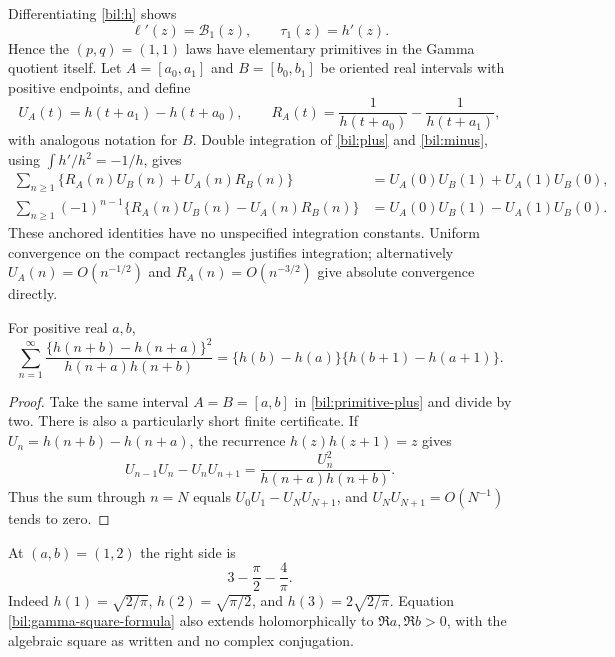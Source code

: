 Differentiating \eqref{bil:h} shows
\begin{equation}\label{bil:h-derivative}
 \ell'(z)=\mathcal B_1(z),\qquad \tau_1(z)=h'(z).
\end{equation}
Hence the $(p,q)=(1,1)$ laws have elementary primitives in the Gamma
quotient itself. Let $A=[a_0,a_1]$ and $B=[b_0,b_1]$ be oriented
real intervals with positive endpoints, and define
\[
 U_A(t)=h(t+a_1)-h(t+a_0),\qquad
 R_A(t)=\frac1{h(t+a_0)}-\frac1{h(t+a_1)},
\]
with analogous notation for $B$. Double integration of
\eqref{bil:plus} and \eqref{bil:minus}, using
$\int h'/h^2=-1/h$, gives
\begin{align}
 \sum_{n\ge1}\{R_A(n)U_B(n)+U_A(n)R_B(n)\}
 &=U_A(0)U_B(1)+U_A(1)U_B(0),\label{bil:primitive-plus}\\
 \sum_{n\ge1}(-1)^{n-1}\{R_A(n)U_B(n)-U_A(n)R_B(n)\}
 &=U_A(0)U_B(1)-U_A(1)U_B(0).\label{bil:primitive-minus}
\end{align}
These anchored identities have no unspecified integration constants.
Uniform convergence on the compact rectangles justifies integration;
alternatively $U_A(n)=O(n^{-1/2})$ and $R_A(n)=O(n^{-3/2})$
give absolute convergence directly.

\begin{corollary}\label{bil:gamma-square}
For positive real $a,b$,
\begin{equation}\label{bil:gamma-square-formula}
 \boxed{\sum_{n=1}^{\infty}
   \frac{\{h(n+b)-h(n+a)\}^{2}}{h(n+a)h(n+b)}
   =\{h(b)-h(a)\}\{h(b+1)-h(a+1)\}.}
\end{equation}
\end{corollary}
\begin{proof}
Take the same interval $A=B=[a,b]$ in
\eqref{bil:primitive-plus} and divide by two.
There is also a particularly short finite certificate. If
$U_n=h(n+b)-h(n+a)$, the recurrence $h(z)h(z+1)=z$ gives
\[
 U_{n-1}U_n-U_nU_{n+1}
       =\frac{U_n^2}{h(n+a)h(n+b)}.
\]
Thus the sum through $n=N$ equals $U_0U_1-U_NU_{N+1}$, and
$U_NU_{N+1}=O(N^{-1})$ tends to zero.
\end{proof}
At $(a,b)=(1,2)$ the right side is
\begin{equation}\label{bil:gamma-square-example}
 3-\frac\pi2-\frac4\pi.
\end{equation}
Indeed $h(1)=\sqrt{2/\pi}$, $h(2)=\sqrt{\pi/2}$, and
$h(3)=2\sqrt{2/\pi}$. Equation \eqref{bil:gamma-square-formula}
also extends holomorphically to $\Re a,\Re b>0$, with the algebraic
square as written and no complex conjugation.

